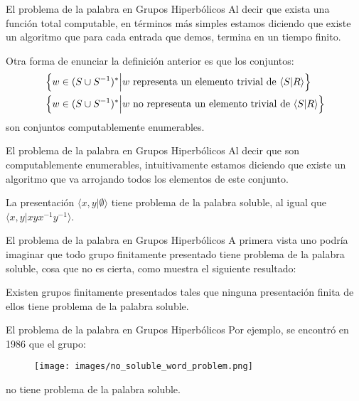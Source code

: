 \documentclass[xcolor=dvipsnames]{beamer}
\theoremstyle{largebreak}
\newcommand{\gen}[1]{\ensuremath{\langle#1\rangle}}
\begin{document}
\begin{frame}{El problema de la palabra en Grupos Hiperbólicos}
    Al decir que exista una función total computable, en términos más simples estamos diciendo que existe un algoritmo que para cada entrada que demos, termina en un tiempo finito.

    \begin{obs}
        Otra forma de enunciar la definición anterior es que los conjuntos:
        \begin{equation*}
            \begin{split}
                &\left\{w\in(S\cup S^{-1})^*\Big|w\textup{ representa un elemento trivial de }\gen{S|R} \right\}\\
                &\left\{w\in(S\cup S^{-1})^*\Big|w\textup{ no representa un elemento trivial de }\gen{S|R} \right\}\\
            \end{split}
        \end{equation*}
        son conjuntos computablemente enumerables.
    \end{obs}
\end{frame}

\begin{frame}{El problema de la palabra en Grupos Hiperbólicos}
    Al decir que son computablemente enumerables, intuitivamente estamos diciendo que existe un algoritmo que va arrojando todos los elementos de este conjunto.

    \begin{exa}
        La presentación $\gen{x,y|\emptyset}$ tiene problema de la palabra soluble, al igual que $\gen{x,y|xyx^{-1}y^{-1}}$.
    \end{exa}
\end{frame}

\begin{frame}{El problema de la palabra en Grupos Hiperbólicos}
    A primera vista uno podría imaginar que todo grupo finitamente presentado tiene problema de la palabra soluble, cosa que no es cierta, como muestra el siguiente resultado:

    \pause

    \begin{theor}
        Existen grupos finitamente presentados tales que ninguna presentación finita de ellos tiene problema de la palabra soluble.
    \end{theor}
\end{frame}

\begin{frame}{El problema de la palabra en Grupos Hiperbólicos}
    Por ejemplo, se encontró en 1986 que el grupo:
    
    \pause
    
    \begin{figure}
        \begin{center}
            \texttt{[image: images/no\_soluble\_word\_problem.png]}
        \end{center}
    \end{figure}
    
    \pause

    no tiene problema de la palabra soluble.
\end{frame}
\end{document}
